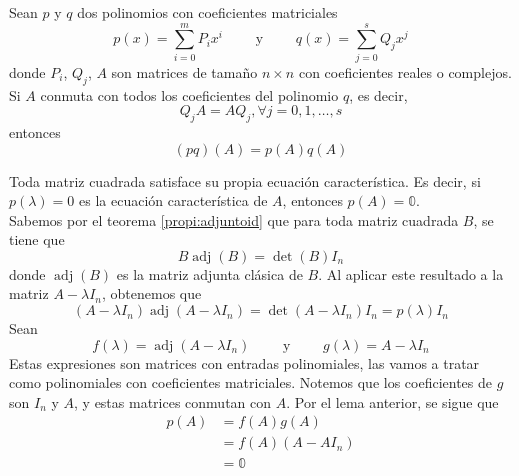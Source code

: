 \begin{lemma}
    Sean $p$ y $q$ dos polinomios con coeficientes matriciales
    $$p(x) = \sum_{i=0}^m P_ix^i \qquad \text{ y } \qquad q(x) = \sum_{j=0}^s Q_jx^j$$
    donde $P_i$, $Q_j$, $A$ son matrices de tamaño $n \times n$ con coeficientes reales o complejos. Si $A$ conmuta con todos los coeficientes del polinomio $q$, es decir,
    $$Q_j A = AQ_j, \forall j = 0, 1, \dots, s$$\newpage\noindent
    entonces
    $$(pq)(A) = p(A)q(A)$$
\end{lemma}

\begin{theorem}
    Toda matriz cuadrada satisface su propia ecuación característica. Es decir, si $p(\lambda) = 0$ es la ecuación característica de $A$, entonces $p(A) = \mathbb{0}$. \\
    \demostracion Sabemos por el teorema \ref{propi:adjuntoid} que para toda matriz cuadrada $B$, se tiene que
    $$B \operatorname{adj}(B) = \operatorname{det}(B) I_n$$
    donde $\operatorname{adj}(B)$ es la matriz adjunta clásica de $B$. Al aplicar este resultado a la matriz $A - \lambda I_n$, obtenemos que
    $$(A - \lambda I_n) \operatorname{adj}(A - \lambda I_n) = \operatorname{det}(A - \lambda I_n) I_n = p(\lambda) I_n$$
    Sean
    $$f(\lambda) = \operatorname{adj}(A - \lambda I_n) \qquad \text{ y } \qquad g(\lambda) = A - \lambda I_n$$
    Estas expresiones son matrices con entradas polinomiales, las vamos a tratar como polinomiales con coeficientes matriciales. Notemos que los coeficientes de $g$ son $I_n$ y $A$, y estas matrices conmutan con $A$. Por el lema anterior, se sigue que
    \begin{align*}
        p(A) & = f(A)g(A) \\
        & = f(A) (A - AI_n) \\
        & = \mathbb{0}
    \end{align*}
\end{theorem}

